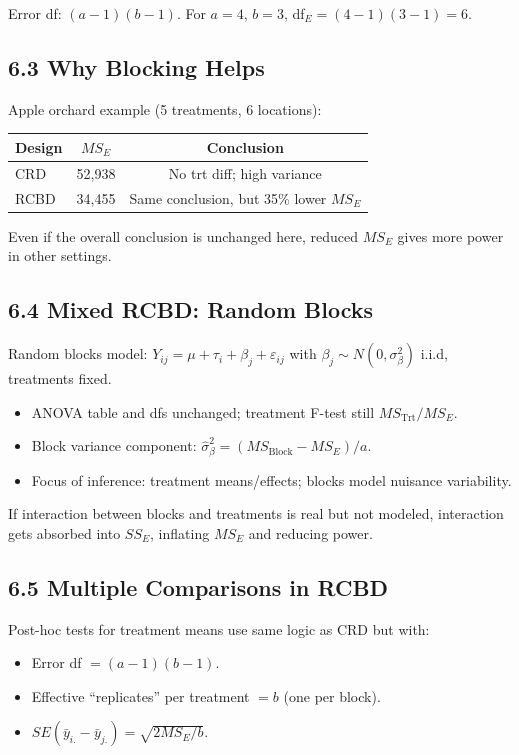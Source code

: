 \documentclass[9pt,letterpaper]{article}
\begin{document}
Error df: $(a-1)(b-1)$. For $a=4$, $b=3$, df$_E=(4-1)(3-1)=6$.

\subsection{6.3 Why Blocking Helps}

Apple orchard example (5 treatments, 6 locations):

\begin{center}\small
\begin{tabular}{@{}lcc@{}}
\toprule
Design & $MS_E$ & Conclusion \\
\midrule
CRD & 52,938 & No trt diff; high variance \\
RCBD & 34,455 & Same conclusion, but 35\% lower $MS_E$ \\
\bottomrule
\end{tabular}
\end{center}

Even if the overall conclusion is unchanged here, reduced $MS_E$ gives more power in other settings.

\subsection{6.4 Mixed RCBD: Random Blocks}

Random blocks model: $Y_{ij}=\mu+\tau_i+\beta_j+\varepsilon_{ij}$ with $\beta_j\sim N(0,\sigma_\beta^2)$ i.i.d, treatments fixed.

\begin{itemize}
    \item ANOVA table and dfs unchanged; treatment F-test still $MS_{\text{Trt}}/MS_E$.
    \item Block variance component: $\hat{\sigma}_\beta^2=(MS_{\text{Block}}-MS_E)/a$.
    \item Focus of inference: treatment means/effects; blocks model nuisance variability.
\end{itemize}

If interaction between blocks and treatments is real but not modeled, interaction gets absorbed into $SS_E$, inflating $MS_E$ and reducing power.

\subsection{6.5 Multiple Comparisons in RCBD}

Post-hoc tests for treatment means use same logic as CRD but with:
\begin{itemize}
    \item Error df $=(a-1)(b-1)$.
    \item Effective ``replicates'' per treatment $=b$ (one per block).
    \item $SE(\bar{y}_{i.}-\bar{y}_{j.})=\sqrt{2MS_E/b}$.
\end{itemize}
\end{document}

